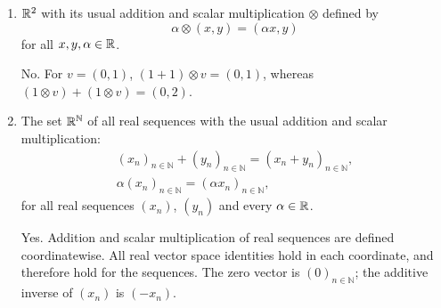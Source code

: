 \begin{enumerate}[label=\alph*)]
\begin{answer}
No. For $v=(0,1)$, $1\otimes v=(0,0)\ne v$, violating the scalar identity axiom.
\end{answer}

\item $\mathbb R^2$ with its usual addition and scalar multiplication $\otimes$ defined by
\[
\alpha\otimes(x,y)=(\alpha x,y)
\]
for all $x,y,\alpha\in\mathbb R$.

\begin{answer}
No. For $v=(0,1)$,
$(1+1)\otimes v=(0,1)$, whereas
$(1\otimes v)+(1\otimes v)=(0,2)$.
\end{answer}

\item The set $\mathbb R^{\mathbb N}$ of all real sequences with the usual addition and scalar multiplication:
\[
\begin{gathered}(x_n)_{n\in\mathbb N}+(y_n)_{n\in\mathbb N}=(x_n+y_n)_{n\in\mathbb N},\\\alpha(x_n)_{n\in\mathbb N}=(\alpha x_n)_{n\in\mathbb N},\end{gathered}
\]
for all real sequences $(x_n)$, $(y_n)$ and every $\alpha\in\mathbb R$.

\begin{answer}
Yes. Addition and scalar multiplication of real sequences are defined
coordinatewise. All real vector space identities hold in each coordinate,
and therefore hold for the sequences. The zero vector is $(0)_{n\in\mathbb N}$;
the additive inverse of $(x_n)$ is $(-x_n)$.
\end{answer}
\end{enumerate}
